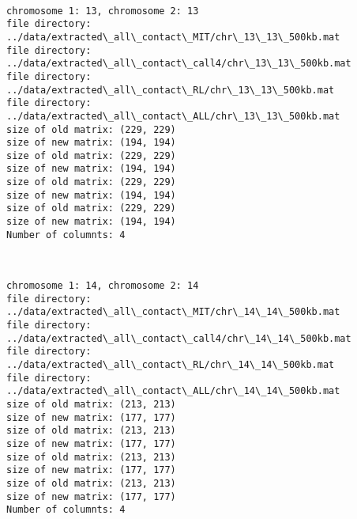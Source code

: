 \documentclass[11pt]{article}
\begin{document}
    \begin{center}
    \end{center}
    { \hspace*{\fill} \\}
    
    \begin{Verbatim}[commandchars=\\\{\}]
chromosome 1: 13, chromosome 2: 13
file directory: ../data/extracted\_all\_contact\_MIT/chr\_13\_13\_500kb.mat
file directory: ../data/extracted\_all\_contact\_call4/chr\_13\_13\_500kb.mat
file directory: ../data/extracted\_all\_contact\_RL/chr\_13\_13\_500kb.mat
file directory: ../data/extracted\_all\_contact\_ALL/chr\_13\_13\_500kb.mat
size of old matrix: (229, 229)
size of new matrix: (194, 194)
size of old matrix: (229, 229)
size of new matrix: (194, 194)
size of old matrix: (229, 229)
size of new matrix: (194, 194)
size of old matrix: (229, 229)
size of new matrix: (194, 194)
Number of columnts: 4

    \end{Verbatim}

    \begin{center}
    \end{center}
    { \hspace*{\fill} \\}
    
    \begin{Verbatim}[commandchars=\\\{\}]
chromosome 1: 14, chromosome 2: 14
file directory: ../data/extracted\_all\_contact\_MIT/chr\_14\_14\_500kb.mat
file directory: ../data/extracted\_all\_contact\_call4/chr\_14\_14\_500kb.mat
file directory: ../data/extracted\_all\_contact\_RL/chr\_14\_14\_500kb.mat
file directory: ../data/extracted\_all\_contact\_ALL/chr\_14\_14\_500kb.mat
size of old matrix: (213, 213)
size of new matrix: (177, 177)
size of old matrix: (213, 213)
size of new matrix: (177, 177)
size of old matrix: (213, 213)
size of new matrix: (177, 177)
size of old matrix: (213, 213)
size of new matrix: (177, 177)
Number of columnts: 4

    \end{Verbatim}

    \begin{center}
    \end{center}
    { \hspace*{\fill} \\}
    
\end{document}
